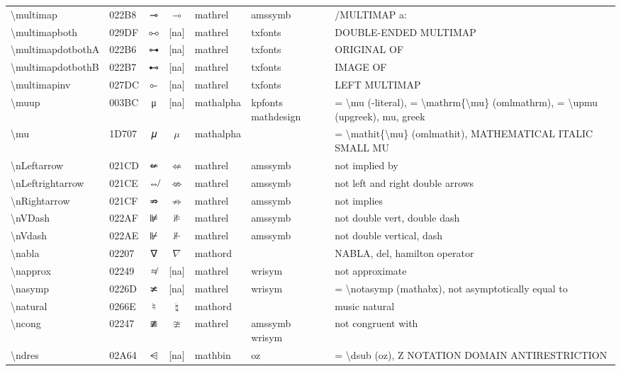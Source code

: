 \documentclass[a4paper,landscape]{article}
\begin{document}
\begin{longtable}{llcclll}
\textbackslash{}multimap & 022B8 & ⊸ & $\multimap$ & mathrel & amssymb & /MULTIMAP a: \\
\textbackslash{}multimapboth & 029DF & ⧟ & [na] & mathrel & txfonts & DOUBLE-ENDED MULTIMAP \\
\textbackslash{}multimapdotbothA & 022B6 & ⊶ & [na] & mathrel & txfonts & ORIGINAL OF \\
\textbackslash{}multimapdotbothB & 022B7 & ⊷ & [na] & mathrel & txfonts & IMAGE OF \\
\textbackslash{}multimapinv & 027DC & ⟜ & [na] & mathrel & txfonts & LEFT MULTIMAP \\
\textbackslash{}muup & 003BC & μ & [na] & mathalpha & kpfonts mathdesign & = \textbackslash{}mu (-literal), = \textbackslash{}mathrm\{\textbackslash{}mu\} (omlmathrm),  = \textbackslash{}upmu (upgreek),  mu,  greek \\
\textbackslash{}mu & 1D707 & 𝜇 & $\mu$ & mathalpha &  & = \textbackslash{}mathit\{\textbackslash{}mu\} (omlmathit), MATHEMATICAL ITALIC SMALL MU \\
\textbackslash{}nLeftarrow & 021CD & ⇍ & $\nLeftarrow$ & mathrel & amssymb & not implied by \\
\textbackslash{}nLeftrightarrow & 021CE & ⇎ & $\nLeftrightarrow$ & mathrel & amssymb & not left and right double arrows \\
\textbackslash{}nRightarrow & 021CF & ⇏ & $\nRightarrow$ & mathrel & amssymb & not implies \\
\textbackslash{}nVDash & 022AF & ⊯ & $\nVDash$ & mathrel & amssymb & not double vert, double dash \\
\textbackslash{}nVdash & 022AE & ⊮ & $\nVdash$ & mathrel & amssymb & not double vertical, dash \\
\textbackslash{}nabla & 02207 & ∇ & $\nabla$ & mathord &  & NABLA, del, hamilton operator \\
\textbackslash{}napprox & 02249 & ≉ & [na] & mathrel & wrisym & not approximate \\
\textbackslash{}nasymp & 0226D & ≭ & [na] & mathrel & wrisym & = \textbackslash{}notasymp (mathabx),  not asymptotically equal to \\
\textbackslash{}natural & 0266E & ♮ & $\natural$ & mathord &  & music natural \\
\textbackslash{}ncong & 02247 & ≇ & $\ncong$ & mathrel & amssymb wrisym & not congruent with \\
\textbackslash{}ndres & 02A64 & ⩤ & [na] & mathbin & oz & = \textbackslash{}dsub (oz),  Z NOTATION DOMAIN ANTIRESTRICTION \\

\end{longtable}
\end{document}
